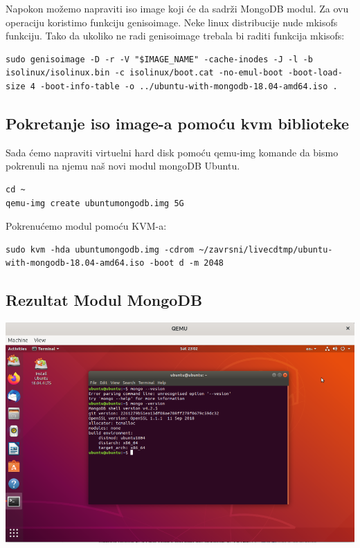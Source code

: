 \documentclass[12pt,vi]{mitthesis}
\begin{document}
\noindent
Napokon možemo napraviti iso image koji će da sadrži MongoDB modul. Za ovu operaciju koristimo funkciju genisoimage. Neke linux distribucije nude mkisofs funkciju. Tako da ukoliko ne radi genisoimage trebala bi raditi funkcija mkisofs:
\begin{lstlisting}[style=BashInputStyle]
sudo genisoimage -D -r -V "$IMAGE_NAME" -cache-inodes -J -l -b isolinux/isolinux.bin -c isolinux/boot.cat -no-emul-boot -boot-load-size 4 -boot-info-table -o ../ubuntu-with-mongodb-18.04-amd64.iso .
\end{lstlisting}

\subsection*{Pokretanje iso image-a pomoću kvm biblioteke}
\indent
Sada ćemo napraviti virtuelni hard disk pomoću qemu-img komande da bismo pokrenuli na njemu naš novi modul mongoDB Ubuntu.
\begin{lstlisting}[style=BashInputStyle]
cd ~
qemu-img create ubuntumongodb.img 5G
\end{lstlisting}

\noindent 
Pokrenućemo modul pomoću KVM-a:
\begin{lstlisting}[style=BashInputStyle]
sudo kvm -hda ubuntumongodb.img -cdrom ~/zavrsni/livecdtmp/ubuntu-with-mongodb-18.04-amd64.iso -boot d -m 2048
\end{lstlisting}

\subsection*{Rezultat Modul MongoDB}
\includegraphics[width=\linewidth]{images/mongoLive.png} 
\newpage
\end{document}
